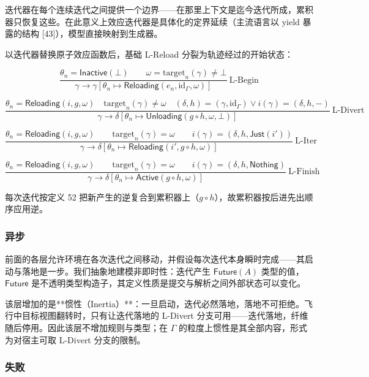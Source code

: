 \documentclass[11pt,a4paper]{article}
\theoremstyle{plain}
\theoremstyle{definition}
\theoremstyle{remark}
\begin{document}
迭代器在每个连续迭代之间提供一个边界——在那里上下文是迄今迭代所成，累积器只恢复这些。在此意义上效应迭代器是具体化的定界延续（主流语言以 yield 暴露的结构 [43]），模型直接映射到生成器。

以迭代器替换原子效应函数后，基础 L-Reload 分裂为轨迹经过的开始状态：

\[
\frac{\theta_n = \mathsf{Inactive}(\bot) \qquad \omega = \mathrm{target}_n(\gamma) \neq \bot}
{\gamma \longrightarrow \gamma[\theta_n \mapsto \mathsf{Reloading}(e_n, \mathrm{id}_\Gamma, \omega)]}\ \text{L-Begin}
\]

\[
\frac{\theta_n = \mathsf{Reloading}(i,g,\omega) \quad \mathrm{target}_n(\gamma) \neq \omega \quad (\delta,h) = (\gamma,\mathrm{id}_\Gamma) \vee i(\gamma) = (\delta,h,-)}
{\gamma \longrightarrow \delta[\theta_n \mapsto \mathsf{Unloading}(g \circ h, \omega, \bot)]}\ \text{L-Divert}
\]

\[
\frac{\theta_n = \mathsf{Reloading}(i,g,\omega) \qquad \mathrm{target}_n(\gamma) = \omega \qquad i(\gamma) = (\delta,h,\mathsf{Just}(i'))}
{\gamma \longrightarrow \delta[\theta_n \mapsto \mathsf{Reloading}(i', g \circ h, \omega)]}\ \text{L-Iter}
\]

\[
\frac{\theta_n = \mathsf{Reloading}(i,g,\omega) \qquad \mathrm{target}_n(\gamma) = \omega \qquad i(\gamma) = (\delta,h,\mathsf{Nothing})}
{\gamma \longrightarrow \delta[\theta_n \mapsto \mathsf{Active}(g \circ h, \omega)]}\ \text{L-Finish}
\]

每次迭代按定义 52 把新产生的逆复合到累积器上（$g \circ h$），故累积器按后进先出顺序应用逆。

\subsubsection{异步}

前面的各层允许环境在各次迭代之间移动，并假设每次迭代本身瞬时完成——其启动与落地是一步。我们抽象地建模非即时性：迭代产生 $\mathsf{Future}(A)$ 类型的值，$\mathsf{Future}$ 是不透明类型构造子，其定义性质是提交与解析之间外部状态可以变化。

该层增加的是**惯性（Inertia）**：一旦启动，迭代必然落地，落地不可拒绝。飞行中目标视图翻转时，只有让迭代落地的 L-Divert 分支可用——迭代落地，纤维随后停用。因此该层不增加规则与类型；在 $\Gamma$ 的粒度上惯性是其全部内容，形式为对宿主可取 L-Divert 分支的限制。

\subsubsection{失败}
\end{document}
